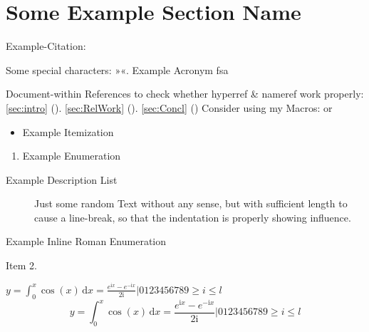 



\section{Some Example Section Name}

Example-Citation:
\cite{DenKr_denkrement1_indeco}

\npi%
Some special characters:
»«.
\nl%
\nl%
Example Acronym\nl
\gls{fsa}

\npi%
Document-within References to check whether hyperref \& nameref work properly:\nl%
\ref{sec:intro} (). \ref{sec:RelWork}  (). \ref{sec:Concl} ()\nl%
Consider using my Macros:\nl
{} or 

\npi%
\begin{itemize}
\item%
    Example Itemization
\end{itemize}
\begin{enumerate}
\item%
    Example Enumeration
\end{enumerate}
\begin{description}
\item[Example Description List]%
    Just some random Text without any sense, but with sufficient length to cause a line-break, so that the indentation is properly showing influence.
\end{description}
\begin{enuminlrom}
\item%
    Example Inline Roman Enumeration
\item%
    Item 2.
\end{enuminlrom}

\np
\newcommand{\I}{\mathrm{i}}
$y = \int_0^x\cos(x)\,\mathrm{d}{x} = \frac{e^{\I x} - e^{-\I x}}{2\I} | 0123456789 \geq i \leqslant l$
\nl
\begin{equation}
y = \int_0^x\cos(x)\,\mathrm{d}{x} = \frac{e^{\I x} - e^{-\I x}}{2\I} | 0123456789 \geq i \leqslant l
\end{equation}

\npi%
{%
    \LARGE%
    \contourlength{\DenKrOutlineWidth}%
    \nl%
    {%
        \contourlength{0.2em}%
        \nl%
        \nl%
    }%
    \nl%
}%



